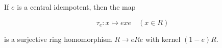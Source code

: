 If $e$ is a central idempotent, then the map

$$\tau_e: x \mapsto exe \quad (x \in R)$$

is a surjective ring homomorphism $R \to eRe$ with kernel $(1-e)R$.

